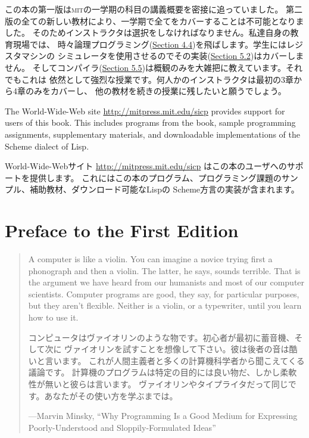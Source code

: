 \documentclass[oneside]{book}
\newcommand{\acronym}[1]{\textsc{\MakeLowercase{#1}}}
\newcommand{\link}[1]{\hyperref[#1]{#1}}
\begin{document}
この本の第一版は\acronym{MIT}の一学期の科目の講義概要を密接に追っていました。
第二版の全ての新しい教材により、一学期で全てをカバーすることは不可能となりました。
そのためインストラクタは選択をしなければなりません。私達自身の教育現場では、
時々論理プログラミング(\link{Section 4.4})を飛ばします。学生にはレジスタマシンの
シミュレータを使用させるのでその実装(\link{Section 5.2})はカバーしません。
そしてコンパイラ(\link{Section 5.5})は概観のみを大雑把に教えています。それでもこれは
依然として強烈な授業です。何人かのインストラクタは最初の3章から4章のみをカバーし、
他の教材を続きの授業に残したいと願うでしょう。

The World-Wide-Web site \href{http://mitpress.mit.edu/sicp}{http://mitpress.mit.edu/sicp} provides
support for users of this book.  This includes programs from the book, sample
programming assignments, supplementary materials, and downloadable
implementations of the Scheme dialect of Lisp.

World-Wide-Webサイト \href{http://mitpress.mit.edu/sicp}{http://mitpress.mit.edu/sicp} はこの本のユーザへのサポートを提供します。
これにはこの本のプログラム、プログラミング課題のサンプル、補助教材、ダウンロード可能なLispの
Scheme方言の実装が含まれます。

\label{Preface 1e}
\chapter*{Preface to the First Edition}

\begin{quote}
A computer is like a violin.  You can imagine a novice trying first a
phonograph and then a violin.  The latter, he says, sounds terrible.  That is
the argument we have heard from our humanists and most of our computer
scientists.  Computer programs are good, they say, for particular purposes, but
they aren't flexible.  Neither is a violin, or a typewriter, until you learn
how to use it.

コンピュータはヴァイオリンのような物です。初心者が最初に蓄音機、そして次に
ヴァイオリンを試すことを想像して下さい。彼は後者の音は酷いと言います。
これが人間主義者と多くの計算機科学者から聞こえてくる議論です。
計算機のプログラムは特定の目的には良い物だ、しかし柔軟性が無いと彼らは言います。
ヴァイオリンやタイプライタだって同じです。あなたがその使い方を学ぶまでは。

---Marvin Minsky, ``Why Programming Is a Good Medium for Expressing
Poorly-Understood and Sloppily-Formulated Ideas''
\end{quote}
\end{document}
